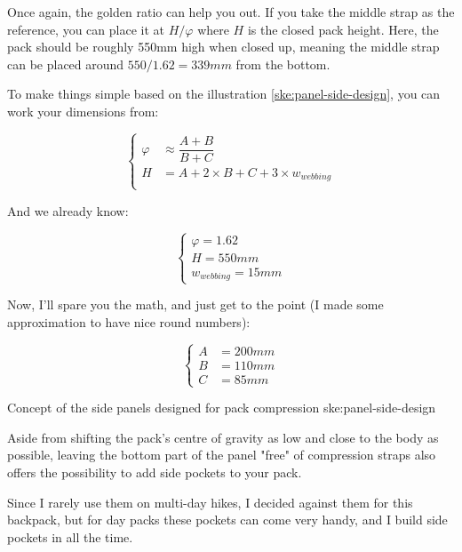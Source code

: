 Once again, the golden ratio can help you out. If you take the middle strap as the reference, you can place it at $H / \varphi$ where $H$ is the closed pack height. Here, the pack should be roughly 550mm high when closed up, meaning the middle strap can be placed around $550 / 1.62 = 339mm$ from the bottom.

To make things simple based on the illustration \ref{ske:panel-side-design}, you can work your dimensions from:

\begin{equation}
  \left\{
    \begin{array}{rl}
     \varphi &\approx \dfrac{A+B}{B+C}\\
      H &= A+2 \times B+C + 3 \times w_{webbing}\\
    \end{array}
  \right.
\end{equation}

And we already know:

\begin{equation}
  \left\{
    \begin{array}{ll}
     \varphi = 1.62\\
      H = 550mm\\
      w_{webbing} = 15mm
    \end{array}
  \right.
\end{equation}

Now, I'll spare you the math, and just get to the point (I made some approximation to have nice round numbers):

\begin{equation}
  \left\{
    \begin{array}{rl}
      A &= 200mm\\
      B &= 110mm\\
      C &= 85mm
    \end{array}
  \right.
\end{equation}

{Concept of the side panels designed for pack compression}
{ske:panel-side-design}

Aside from shifting the pack's centre of gravity as low and close to the body as possible, leaving the bottom part of the panel "free" of compression straps also offers the possibility to add side pockets to your pack.

Since I rarely use them on multi-day hikes, I decided against them for this backpack, but for day packs these pockets can come very handy, and I build side pockets in all the time.

